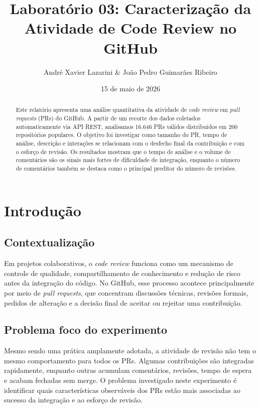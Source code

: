 \documentclass[12pt,a4paper]{article}
\title{Laborat\'orio 03: Caracteriza\c{c}\~ao da Atividade de Code Review no GitHub}
\author{Andr\'e Xavier Lazarini & Jo\~ao Pedro Guimar\~aes Ribeiro}
\date{15 de maio de 2026}
\begin{document}
\maketitle

\begin{abstract}
Este relat\'orio apresenta uma an\'alise quantitativa da atividade de \textit{code review} em \textit{pull requests} (PRs) do GitHub. A partir de um recorte dos dados coletados automaticamente via API REST, analisamos 16.646 PRs v\'alidos distribu\'idos em 200 reposit\'orios populares. O objetivo foi investigar como tamanho do PR, tempo de an\'alise, descri\c{c}\~ao e intera\c{c}\~oes se relacionam com o desfecho final da contribui\c{c}\~ao e com o esfor\c{c}o de revis\~ao. Os resultados mostram que o tempo de an\'alise e o volume de coment\'arios s\~ao os sinais mais fortes de dificuldade de integra\c{c}\~ao, enquanto o n\'umero de coment\'arios tamb\'em se destaca como o principal preditor do n\'umero de revis\~oes.
\end{abstract}

\section{Introdu\c{c}\~ao}

\subsection{Contextualiza\c{c}\~ao}
Em projetos colaborativos, o \textit{code review} funciona como um mecanismo de controle de qualidade, compartilhamento de conhecimento e redu\c{c}\~ao de risco antes da integra\c{c}\~ao do c\'odigo. No GitHub, esse processo acontece principalmente por meio de \textit{pull requests}, que concentram discuss\~oes t\'ecnicas, revis\~oes formais, pedidos de altera\c{c}\~ao e a decis\~ao final de aceitar ou rejeitar uma contribui\c{c}\~ao.

\subsection{Problema foco do experimento}
Mesmo sendo uma pr\'atica amplamente adotada, a atividade de revis\~ao n\~ao tem o mesmo comportamento para todos os PRs. Algumas contribui\c{c}\~oes s\~ao integradas rapidamente, enquanto outras acumulam coment\'arios, revis\~oes, tempo de espera e acabam fechadas sem merge. O problema investigado neste experimento \'e identificar quais caracter\'isticas observ\'aveis dos PRs est\~ao mais associadas ao sucesso da integra\c{c}\~ao e ao esfor\c{c}o de revis\~ao.
\end{document}
